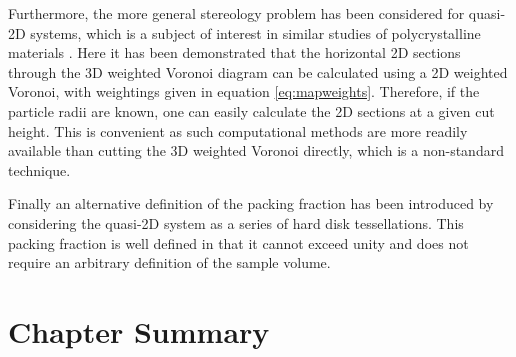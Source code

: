 Furthermore, the more general stereology problem has been considered for quasi\--2D systems, which is a subject of interest in similar studies of polycrystalline materials  \cite{Falco2017,Depriester2019}.
Here it has been demonstrated that the horizontal 2D sections through the 3D weighted Voronoi diagram can be calculated using a 2D weighted Voronoi, with weightings given in equation \eqref{eq:mapweights}.
Therefore, if the particle radii are known, one can easily calculate the 2D sections at a given cut height.
This is convenient as such computational methods are more readily available than cutting the 3D weighted Voronoi directly, which is a non\--standard technique.

Finally an alternative definition of the packing fraction has been introduced by considering the quasi\--2D system as a series of hard disk tessellations.
This packing fraction is well defined in that it cannot exceed unity and does not require an arbitrary definition of the sample volume.

\section{Chapter Summary}